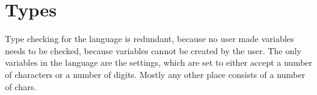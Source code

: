 \section{Types}
Type checking for the language is redundant, because no user made variables needs to be checked, because variables cannot be created by the user. The only variables in the language are the settings, which are set to either accept a number of characters or a number of digits. Mostly any other place consists of a number of chars.
